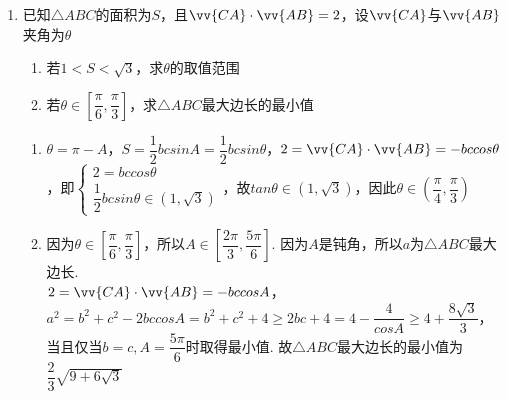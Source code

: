 \begin{enumerate}
\begin{enumerate}
\begin{jieda}
            \begin{enumerate}
                \item 由题意,得 $\left| \vv{CD}\right|  = b\cos C$ ,又 ${2c}\sin B = \sqrt{5}\left| \vv{CD}\right|$ ,所以 ${2c}\sin B = \sqrt{5}b\cos C$ ,由正弦定理 $\dfrac{b}{\sin B} = \dfrac{c}{\sin C}$ ,得 $2\sin C\sin B =  \sqrt{5}\sin B\cos C$ ,又 $\sin B \neq  0$ ,所以 $2\sin C = \sqrt{5}\cos C$ ,因为 $C$ 为锐角,所以 $\cos C = \sqrt{1 - {\sin }^{2}C} = \dfrac{2}{3}$
                \item 由 $a = {3c}\cos B$ ，得 $\cos B = \dfrac{a}{3c}$ ，由余弦定理得 $\cos B =  \dfrac{{a}^{2} + {c}^{2} - {b}^{2}}{2ac}$ ,所以 $\dfrac{{a}^{2} + {c}^{2} - {b}^{2}}{2ac} = \dfrac{a}{3c}$ ,得 ${a}^{2} + 3{c}^{2} = 3{b}^{2}$
                
                由余弦定理得 $\cos C = \dfrac{{a}^{2} + {b}^{2} - {c}^{2}}{2ab} = \dfrac{2}{3}$ ,得 $3{a}^{2} + 3{b}^{2} - 3{c}^{2} =  4\sqrt{3}a$
                
                联立两式，解得 $a = \sqrt{3},c = \sqrt{2}$ ，故 $\bigtriangleup  {ABC}$ 的周长为 $a + b + c = 2\sqrt{3} + \sqrt{2}$.
            \end{enumerate}
        \end{jieda}
        \item 已知$\triangle ABC$的面积为$S$，且$\vv{CA} \cdot \vv{AB} = 2$，设$\vv{CA}$与$\vv{AB}$夹角为$\theta$
        \begin{enumerate}
            \item 若$1 < S < \sqrt{3}$，求$\theta$的取值范围
            \item 若$\theta \in \left[\dfrac{\pi}{6}, \dfrac{\pi}{3}\right]$，求$\triangle ABC$最大边长的最小值
        \end{enumerate}
        \begin{jieda}
            \begin{enumerate}
                \item $\theta = \pi - A$，$S = \dfrac{1}{2}bcsinA = \dfrac{1}{2}bcsin\theta$，$2 = \vv{CA} \cdot \vv{AB} = -bccos\theta$，即$\left \{\begin{array}{l}
                 2 = bccos\theta \\
                 \dfrac{1}{2}bcsin\theta \in (1, \sqrt{3})
                \end{array} \right.$，故$tan\theta \in (1,\sqrt{3})$，因此$\theta \in \left(\dfrac{\pi}{4}, \dfrac{\pi}{3}\right)$
                \item 因为$\theta \in \left[\dfrac{\pi}{6}, \dfrac{\pi}{3}\right]$，所以$A \in \left[\dfrac{2\pi}{3}, \dfrac{5\pi}{6}\right]$. 因为$A$是钝角，所以$a$为$\triangle ABC$最大边长. \\
                $2 = \vv{CA} \cdot \vv{AB} = -bccosA$，$a^2 = b^2 + c^2 - 2bccosA = b^2+c^2+4 \geq 2bc + 4 = 4-\dfrac{4}{cosA} \geq 4 + \dfrac{8\sqrt{3}}{3}$，当且仅当$b = c, A = \dfrac{5\pi}{6}$时取得最小值.
                故$\triangle ABC$最大边长的最小值为$\dfrac{2}{3}\sqrt{9+6\sqrt{3}}$
            \end{enumerate}
        \end{jieda}


\end{enumerate}
\end{enumerate}
